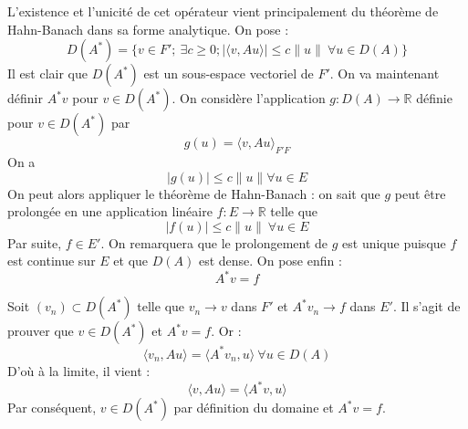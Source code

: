 


L'existence et l'unicité de cet opérateur vient principalement du théorème de Hahn-Banach dans sa forme analytique. On pose : \[D(A^*)=\{v\in F';\ \exists c\geq 0 ; |\langle v,Au\rangle|\leq c\|u\|\ \forall u\in D(A)\}\]
Il est clair que $D(A^*)$ est un sous-espace vectoriel de $F'$. On va maintenant définir $A^*v$ pour $v\in D(A^*)$. On considère l'application $g:D(A)\to\mathbb{R}$ définie pour $v\in D(A^*)$ par \[g(u)=\langle v,Au\rangle_{F'F}\]
On a \[|g(u)|\leq c\|u\| \forall u\in E\]
On peut alors appliquer le théorème de Hahn-Banach : on sait que $g$ peut être prolongée en une application linéaire $f:E\to \mathbb{R}$ telle que \[|f(u)|\leq c\|u\|\ \forall u\in E\]
Par suite, $f\in E'$. On remarquera que le prolongement de $g$ est unique puisque $f$ est continue sur $E$ et que $D(A)$ est dense. On pose enfin : \[A^*v=f\]


\begin{dem}
Soit $(v_n)\subset D(A^*)$ telle que $v_n\to v$ dans $F'$ et $A^*v_n\to f$ dans $E'$. Il s'agit de prouver que $v\in D(A^*)$ et $A^*v=f$. Or : 
	\[\langle v_n, Au\rangle=\langle A^*v_n,u\rangle\ \forall u\in D(A)\]
D'où à la limite, il vient :
	\[\langle v, Au\rangle = \langle A^*v, u\rangle\]
Par conséquent, $v\in D(A^*)$ par définition du domaine et $A^*v=f$.
\end{dem}

